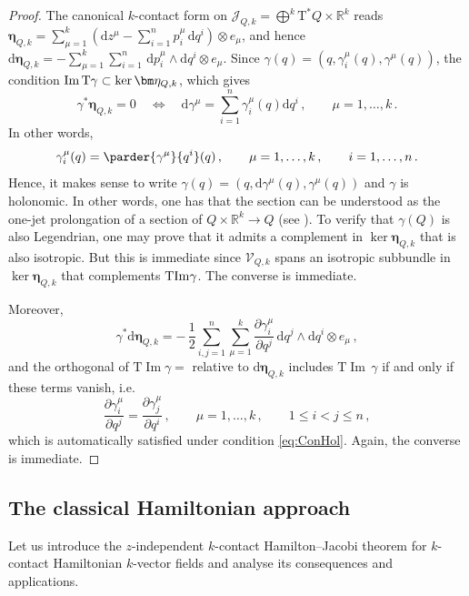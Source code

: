 \documentclass[11pt,twoside]{article}
\theoremstyle{plain}
\theoremstyle{definition}
\theoremstyle{remark}
\newcommand{\R}{\mathbb{R}}
\newcommand{\dd}{\mathrm{d}}
\newcommand{\T}{\mathrm{T}}
\newcommand{\cT}{\mathrm{T}^\ast}
\DeclareMathOperator{\Ima}{Im}
\begin{document}
\begin{proof}
The canonical $k$-contact form on $\mathcal{J}_{Q,k}=\bigoplus^k\cT Q\times \R^k$ reads
${\bm \eta}_{Q,k}=\sum_{\mu=1}^k(\mathrm{d}z^\mu - \sum_{i=1}^np_i^\mu\,\mathrm{d}q^i)\otimes e_\mu$, and hence $\mathrm{d}\bm \eta_{Q,k} = -\sum_{\mu=1}^k\sum_{i=1}^n\,\mathrm{d}p_i^\mu\wedge \mathrm{d}q^i\otimes e_\mu$. Since $\gamma(q)=(q,\gamma^\mu_i(q),\gamma^\mu(q))$, the condition ${\rm Im}\,\T\gamma \subset \ker \bm \eta_{Q,k}$, which gives
$$
\gamma^*\bm \eta_{Q,k}=0\quad\Longleftrightarrow\quad \dd\gamma^\mu=\sum_{i=1}^n\gamma^\mu_i(q)\dd q^i\,,\qquad \mu=1,\ldots,k\,.
$$
In other words, 
\begin{equation}\label{eq:ConHol} \gamma^\mu_i(q)=\parder{\gamma^\mu}{q^i}(q)\,,\qquad  \mu=1,\dotsc,k\,,\qquad i=1,\dotsc,n\,.
\end{equation}
Hence, it makes sense to write $\gamma(q)=(q,\dd\gamma^\mu (q),\gamma^\mu(q))$ and $\gamma$ is holonomic. In other words, one has that the section can be understood as the one-jet prolongation of a section of $Q\times \mathbb{R}^k\rightarrow Q$ (see \cite{Saunders1989}). To verify that $\gamma(Q)$ is also Legendrian, one may prove that it admits a complement  in $\ker \bm \eta_{Q,k}$ that is also isotropic. But this is immediate since $\mathcal{V}_{Q,k}$ spans an isotropic subbundle in $\ker \bm \eta_{Q,k}$ that complements $\T{\rm Im}\gamma$. The converse is immediate.

Moreover, 
\[
\gamma^*\dd\bm \eta_{Q,k}= -\,\frac 12\sum_{i,j=1}^n\sum_{\mu=1}^k\frac{\partial \gamma_i^\mu}{\partial q^j}\,
\mathrm{d}q^j\wedge \mathrm{d}q^i\otimes e_\mu\,,
\]
and the orthogonal of  $\T\Ima\gamma=$ relative to $\dd \bm\eta_{Q,k}$ includes $\T\Ima\,\gamma$ if and only if these terms vanish, i.e.
\begin{equation}\label{eq:closedgamma2}
\frac{\partial \gamma_i^\mu}{\partial q^j} =
\frac{\partial \gamma_j^\mu}{\partial q^i}\,,\qquad \mu=1,\dotsc,k\,,\qquad 1\leq i<j\leq n\,,
\end{equation}
which is automatically satisfied under condition \eqref{eq:ConHol}. Again, the converse is immediate.
\end{proof}

\subsection{The classical Hamiltonian approach}
\label{Sec::zindclass}
Let us introduce the $z$-independent $k$-contact Hamilton--Jacobi theorem for $k$-contact Hamiltonian $k$-vector fields and analyse its consequences and applications. 
\end{document}
